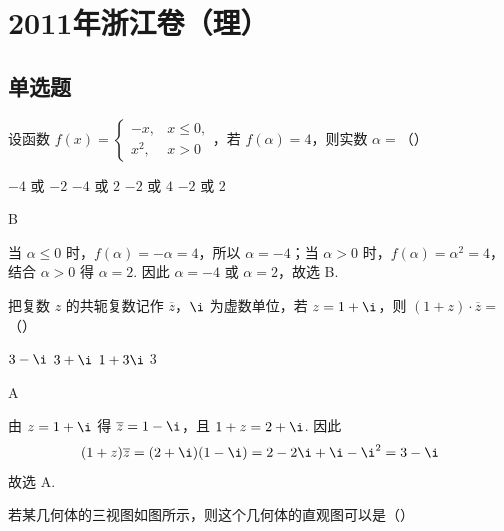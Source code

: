 
\chapter{2011年浙江卷（理）}

\section{单选题}

\begin{problem}
设函数 \( f(x) = \begin{cases}
-x, & x \leqslant 0,\\
x^2, & x > 0
\end{cases} \)，若 \( f(\alpha) = 4 \)，则实数 \( \alpha = \)（\quad）

\choices
    {\(-4\) 或 \(-2\)}
    {\(-4\) 或 \(2\)}
    {\(-2\) 或 \(4\)}
    {\(-2\) 或 \(2\)}
\end{problem}

\begin{answer}
B
\end{answer}

\begin{solution}
当 \(\alpha\leqslant 0\) 时，\(f(\alpha)=-\alpha=4\)，所以 \(\alpha=-4\)；当 \(\alpha>0\) 时，\(f(\alpha)=\alpha^2=4\)，结合 \(\alpha>0\) 得 \(\alpha=2\). 因此 \(\alpha=-4\) 或 \(\alpha=2\)，故选 B.
\end{solution}

\begin{problem}
把复数 \(z\) 的共轭复数记作 \(\overline{z}\)，\(\i\) 为虚数单位，若 \(z = 1 + \i\)，则 \((1 + z)\cdot \overline{z} =\)（\quad）

\choices
    {\(3 - \i\)}
    {\( 3 + \i \)}
    {\( 1 + 3\i \)}
    {\(3\)}
\end{problem}

\begin{answer}
A
\end{answer}

\begin{solution}
由 \(z=1+\i\) 得 \(\overline{z}=1-\i\)，且 \(1+z=2+\i\). 因此
\[
(1+z)\overline{z}=(2+\i)(1-\i)=2-2\i+\i-\i^2=3-\i
\]
故选 A.
\end{solution}

\begin{problem}
若某几何体的三视图如图所示，则这个几何体的直观图可以是（\quad）


    {}
    {}
    {}
\end{problem}


